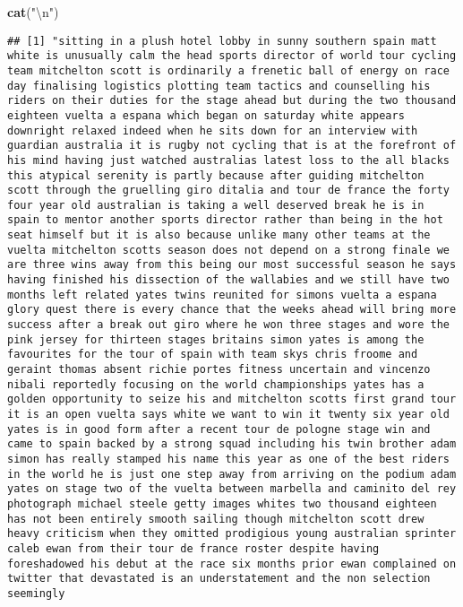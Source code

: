 \documentclass[]{article}
\newenvironment{Shaded}{\begin{snugshade}}{\end{snugshade}}
\newcommand{\KeywordTok}[1]{\textcolor[rgb]{0.13,0.29,0.53}{\textbf{#1}}}
\newcommand{\DecValTok}[1]{\textcolor[rgb]{0.00,0.00,0.81}{#1}}
\newcommand{\CharTok}[1]{\textcolor[rgb]{0.31,0.60,0.02}{#1}}
\newcommand{\StringTok}[1]{\textcolor[rgb]{0.31,0.60,0.02}{#1}}
\newcommand{\OperatorTok}[1]{\textcolor[rgb]{0.81,0.36,0.00}{\textbf{#1}}}
\newcommand{\NormalTok}[1]{#1}
\begin{document}
\begin{Shaded}
\begin{Highlighting}[]
\KeywordTok{cat}\NormalTok{(}\StringTok{"}\CharTok{\textbackslash{}n}\StringTok{"}\NormalTok{)}
\end{Highlighting}
\end{Shaded}

\begin{Shaded}
\end{Shaded}

\begin{verbatim}
## [1] "sitting in a plush hotel lobby in sunny southern spain matt white is unusually calm the head sports director of world tour cycling team mitchelton scott is ordinarily a frenetic ball of energy on race day finalising logistics plotting team tactics and counselling his riders on their duties for the stage ahead but during the two thousand eighteen vuelta a espana which began on saturday white appears downright relaxed indeed when he sits down for an interview with guardian australia it is rugby not cycling that is at the forefront of his mind having just watched australias latest loss to the all blacks this atypical serenity is partly because after guiding mitchelton scott through the gruelling giro ditalia and tour de france the forty four year old australian is taking a well deserved break he is in spain to mentor another sports director rather than being in the hot seat himself but it is also because unlike many other teams at the vuelta mitchelton scotts season does not depend on a strong finale we are three wins away from this being our most successful season he says having finished his dissection of the wallabies and we still have two months left related yates twins reunited for simons vuelta a espana glory quest there is every chance that the weeks ahead will bring more success after a break out giro where he won three stages and wore the pink jersey for thirteen stages britains simon yates is among the favourites for the tour of spain with team skys chris froome and geraint thomas absent richie portes fitness uncertain and vincenzo nibali reportedly focusing on the world championships yates has a golden opportunity to seize his and mitchelton scotts first grand tour it is an open vuelta says white we want to win it twenty six year old yates is in good form after a recent tour de pologne stage win and came to spain backed by a strong squad including his twin brother adam simon has really stamped his name this year as one of the best riders in the world he is just one step away from arriving on the podium adam yates on stage two of the vuelta between marbella and caminito del rey photograph michael steele getty images whites two thousand eighteen has not been entirely smooth sailing though mitchelton scott drew heavy criticism when they omitted prodigious young australian sprinter caleb ewan from their tour de france roster despite having foreshadowed his debut at the race six months prior ewan complained on twitter that devastated is an understatement and the non selection seemingly 
\end{verbatim}
\end{document}
